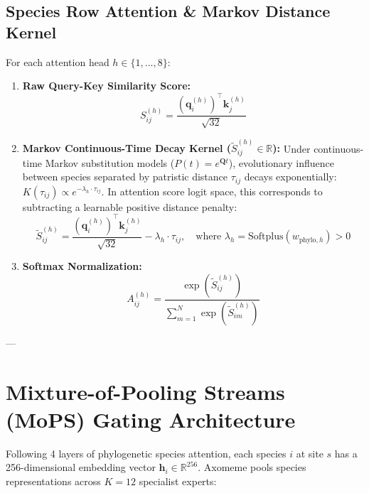\documentclass[11pt,a4paper]{article}
\begin{document}
\subsection{Species Row Attention \& Markov Distance Kernel}
For each attention head $h \in \{1, \dots, 8\}$:
\begin{enumerate}
    \item \textbf{Raw Query-Key Similarity Score:}
    \begin{equation}
    S_{ij}^{(h)} = \frac{(\mathbf{q}_i^{(h)})^\top \mathbf{k}_j^{(h)}}{\sqrt{32}}
    \end{equation}
    \item \textbf{Markov Continuous-Time Decay Kernel ($\tilde{S}_{ij}^{(h)} \in \mathbb{R}$):}
    Under continuous-time Markov substitution models ($P(t) = e^{\mathbf{Q}t}$), evolutionary influence between species separated by patristic distance $\tau_{ij}$ decays exponentially: $K(\tau_{ij}) \propto e^{-\lambda_h \cdot \tau_{ij}}$. In attention score logit space, this corresponds to subtracting a learnable positive distance penalty:
    \begin{equation}
    \tilde{S}_{ij}^{(h)} = \frac{(\mathbf{q}_i^{(h)})^\top \mathbf{k}_j^{(h)}}{\sqrt{32}} - \lambda_h \cdot \tau_{ij}, \quad \text{where } \lambda_h = \text{Softplus}(w_{\text{phylo}, h}) > 0
    \end{equation}
    \item \textbf{Softmax Normalization:}
    \begin{equation}
    A_{ij}^{(h)} = \frac{\exp(\tilde{S}_{ij}^{(h)})}{\sum_{m=1}^N \exp(\tilde{S}_{im}^{(h)})}
    \end{equation}
\end{enumerate}

---

\section{Mixture-of-Pooling Streams (MoPS) Gating Architecture}

Following 4 layers of phylogenetic species attention, each species $i$ at site $s$ has a 256-dimensional embedding vector $\mathbf{h}_i \in \mathbb{R}^{256}$. Axomeme pools species representations across $K=12$ specialist experts:
\end{document}
